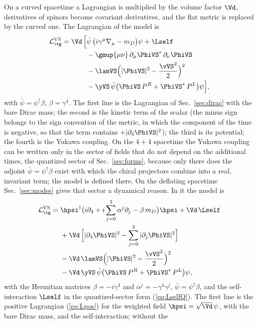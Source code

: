 On a curved spacetime a Lagrangian is multiplied by the volume factor $\Vd$, derivatives of spinors
become covariant derivatives, and the flat metric is replaced by the curved one.
The Lagrangian of the model is
\begin{align}
\mathcal L_{\tg}^{\mathrm{VS}}=\Vd\,\Big[&\bar\psi\,\big(i\gamma^{\mu}\nabla_\mu-m_D\big)\psi+\Lself\nonumber\\
&-\gmup{\mu\nu}\,\partial_\mu\PhiVS^{*}\,\partial_\nu\PhiVS\nonumber\\
&-\lamVS\Big(|\PhiVS|^{2}-\frac{\vVS^{2}}{2}\Big)^{2}\nonumber\\
&-\yVS\,\bar\psi\big(\PhiVS\,P^{R}+\PhiVS^{*}\,P^{L}\big)\psi\Big],
\label{eq:LVS}
\end{align}
with $\bar\psi=\psi^\dagger\beta$, $\beta=\gamma^{4}$. The first line is the Lagrangian of
Sec.~\ref{sec:dirac} with the bare Dirac mass; the second is the kinetic term of the scalar (the minus
sign belongs to the sign convention of the metric, in which the component of the time is negative,
so that the term contains $+|\partial_4\PhiVS|^{2}$); the third is its potential; the fourth is the
Yukawa coupling.
On the $4+4$ spacetime the Yukawa coupling can be written only in the sector of fields that do not
depend on the additional times, the quantized sector of Sec.~\ref{sec:forms}, because only there
does the adjoint $\bar\psi=\psi^\dagger\beta$ exist with which the chiral projectors combine into
a real, invariant term; the model is defined there. On the deflating spacetime Sec.~\ref{sec:modes}
gives that sector a dynamical reason. In it the model is
\begin{align}
\mathcal L_{\tg}^{\mathrm{VS}}={}&\hpsi^\dagger\big(i\partial_4+i\sum_{j=0}^{3}\alpha^{j}\partial_j-\beta\,m_D\big)\hpsi+\Vd\,\Lself\nonumber\\
&+\Vd\,\Big[|\partial_4\PhiVS|^{2}-\sum_{j=0}^{3}|\partial_j\PhiVS|^{2}\Big]\nonumber\\
&-\Vd\,\lamVS\Big(|\PhiVS|^{2}-\frac{\vVS^{2}}{2}\Big)^{2}\nonumber\\
&-\Vd\,\yVS\,\bar\psi\big(\PhiVS\,P^{R}+\PhiVS^{*}\,P^{L}\big)\psi ,
\label{eq:LVS}
\end{align}
with the Hermitian matrices $\beta=-i\gamma^{4}$ and $\alpha^{j}=-\gamma^{4}\gamma^{j}$,
$\bar\psi=\psi^\dagger\beta$, and the self-interaction $\Lself$ in the quantized-sector form
(\ref{eq:LselfQ}). The first line is the positive Lagrangian (\ref{eq:Lpos}) for the weighted field
$\hpsi=\sqrt{\Vd}\,\psi$, with the bare Dirac mass, and the self-interaction; without the
